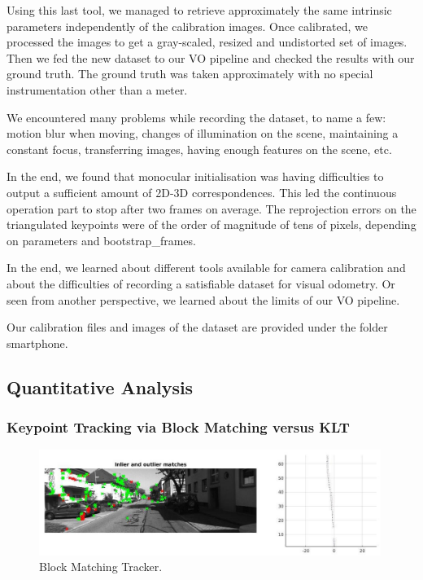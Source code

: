 Using this last tool, we managed to retrieve approximately the same intrinsic parameters independently of the calibration images.
Once calibrated, we processed the images to get a gray-scaled, resized and undistorted set of images. Then we fed the new
dataset to our VO pipeline and checked the results with our ground truth.
The ground truth was taken approximately with no special instrumentation other than a meter.

We encountered many problems while recording the dataset, to name a few: motion blur when moving, changes of illumination on the scene,
maintaining a constant focus, transferring images, having enough features on the scene, etc.

In the end, we found that monocular initialisation was having difficulties to output a sufficient amount of 2D-3D correspondences.
This led the continuous operation part to stop after two frames on average. The reprojection errors on the triangulated keypoints were of
the order of magnitude of tens of pixels, depending on parameters and bootstrap\_frames.

In the end, we learned about different tools available for camera calibration and about the difficulties of recording a satisfiable dataset
for visual odometry. Or seen from another perspective, we learned about the limits of our VO pipeline.

Our calibration files and images of the dataset are provided under the folder smartphone.

\subsection{Quantitative Analysis}
\subsubsection{Keypoint Tracking via Block Matching versus KLT}

\begin{figure}
  \includegraphics[width=0.99\textwidth]{files/block_tracker.jpg}
  \caption[Block Matching Tracker]{\label{f:block_tracker}Block Matching Tracker.}
\end{figure}

